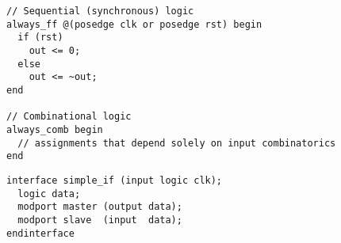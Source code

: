 \documentclass[8pt]{article}
\begin{document}
\begin{lstlisting}
// Sequential (synchronous) logic
always_ff @(posedge clk or posedge rst) begin
  if (rst)
    out <= 0;
  else
    out <= ~out;
end

// Combinational logic
always_comb begin
  // assignments that depend solely on input combinatorics
end
\end{lstlisting}

\begin{lstlisting}
interface simple_if (input logic clk);
  logic data;
  modport master (output data);
  modport slave  (input  data);
endinterface
\end{lstlisting}

\renewcommand{\arraystretch}{1.5}
\newcommand{\gateBox}[3]{
  \begin{minipage}[t]{0.45\textwidth}
    \centering
    \textbf{#1}\\[5pt]
    #2\\[5pt]
    #3
  \end{minipage}
}
\end{document}
